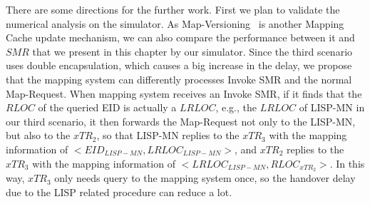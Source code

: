 There are some directions for the further work. First we plan to validate the numerical analysis on the simulator. As Map-Versioning~\cite{rfc6834} is another Mapping Cache update mechanism, we can also compare the performance between it and $SMR$ that we present in this chapter by our simulator. Since the third scenario uses double encapsulation, which causes a big increase in the delay, we propose that the mapping system can differently processes Invoke SMR and the normal Map-Request. When mapping system receives an Invoke SMR, if it finds that the $RLOC$ of the queried EID is actually a $LRLOC$, e.g., the $LRLOC$ of LISP-MN in our third scenario, it then forwards the Map-Request not only to the LISP-MN, but also to the $xTR_2$, so that LISP-MN replies to the $xTR_3$ with the mapping information of $<EID_{LISP-MN}, LRLOC_{LISP-MN}>$, and $xTR_2$ replies to the $xTR_3$ with the mapping information of $<LRLOC_{LISP-MN}, RLOC_{xTR_2}>$. In this way, $xTR_3$ only needs query to the mapping system once, so the handover delay due to the LISP related procedure can reduce a lot.

